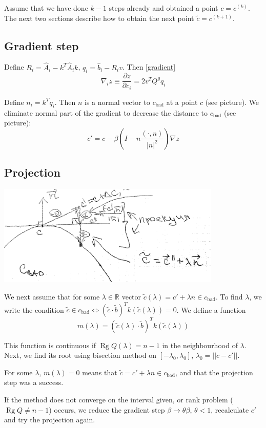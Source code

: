 \documentclass[a4paper]{article}
\DeclareMathOperator{\Rg}{Rg}
\newcommand{\cbad}{c_{\mathrm{bad}}}
\begin{document}
Assume that we have done $k-1$ steps already and obtained a point $c=c^{(k)}$. The next two sections describe how to obtain the next point $\tilde{c}=c^{(k+1)}$.

\subsection{Gradient step}
Define $R_i=\hat{A}_i-k^T\hat{A}_ik$, $q_i=\hat{b}_i-R_iv$. Then \ref{gradient}
$$\nabla_iz\equiv \frac{\partial z}{\partial c_i}=2v^TQ^gq_i$$

Define $n_i=k^Tq_i$. Then $n$ is a normal vector to $\cbad$ at a point $c$ (see picture). We eliminate normal part of the gradient to decrease the distance to $\cbad$ (see picture):
$$c'=c-\beta\left(I-n\frac{(\cdot, n)}{|n|^2}\right)\nabla z$$

\subsection{Projection}
\includegraphics[width=0.8\textwidth]{c_bad_continuum.png}

We next assume that for some $\lambda\in\mathbb{R}$ vector $\tilde{c}(\lambda)=c'+\lambda n\in\cbad$. To find $\lambda$, we write the condition $\tilde{c}\in\cbad\Leftrightarrow (\tilde{c}\cdot \tilde{b})^T k(\tilde{c}(\lambda))=0$. We define a function
$$m(\lambda)=(\tilde{c}(\lambda)\cdot \tilde{b})^T k(\tilde{c}(\lambda))$$

This function is continuous if $\Rg Q(\lambda)=n-1$ in the neighbourhood of $\lambda$. Next, we find its root using bisection method on $[-\lambda_0,\lambda_0]$, $\lambda_0=||c-c'||$.

For some $\lambda$, $m(\lambda)=0$ means that $\tilde{c}=c'+\lambda n\in\cbad$, and that the projection step was a success.

If the method does not converge on the interval given, or rank problem ($\Rg Q\neq n-1$) occurs, we reduce the gradient step $\beta\to \theta\beta$, $\theta <1$, recalculate $c'$ and try the projection again.
\end{document}

